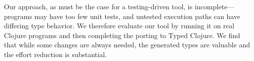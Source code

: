 Our approach, as must be the case for a testing-driven tool, is
incomplete---programs may have too few unit tests, and untested
execution paths can have differing type behavior. We therefore
evaluate our tool by running it on real Clojure programs and then
completing the porting to Typed Clojure. We find that while
some changes are always needed, the generated types are
valuable and the effort reduction is substantial.

%
%
%
